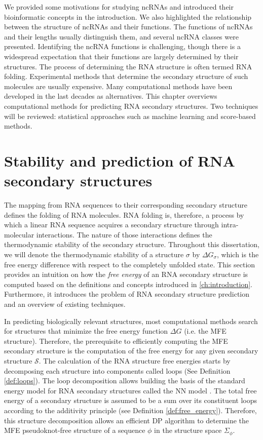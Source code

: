 We provided some motivations for studying \acp{ncRNA} and introduced their bioinformatic concepts in the introduction. We also highlighted the relationship between the structure of \acp{ncRNA} and their functions. The functions of \acp{ncRNA} and their lengths usually distinguish them, and several \ac{ncRNA} classes were presented. Identifying the \ac{ncRNA} functions is challenging, though there is a widespread expectation that their functions are largely determined by their structures. The process of determining the \ac{RNA} structure is often termed \ac{RNA} folding. Experimental methods that determine the secondary structure of such molecules are usually expensive. Many computational methods have been developed in the last decades as alternatives. This chapter overviews computational methods for predicting \ac{RNA} secondary structures. Two techniques will be reviewed: statistical approaches such as machine learning and score-based methods.


\section{Stability and prediction of RNA secondary structures}

The mapping from \ac{RNA} sequences to their corresponding secondary structure defines the folding of \ac{RNA} molecules. \ac{RNA} folding is, therefore, a process by which a linear \ac{RNA} sequence acquires a secondary structure through intra-molecular interactions. The nature of those interactions defines the thermodynamic stability of the secondary structure. Throughout this dissertation, we will denote the thermodynamic stability of a structure $\sigma$ by $\Delta G_{\sigma}$, which is the free energy difference with respect to the completely unfolded state.  This section provides an intuition on how the \textit{free energy} of an RNA secondary structure is computed based on the definitions and concepts introduced in \autoref{ch:introduction}. Furthermore, it introduces the problem of RNA secondary structure prediction and an overview of existing techniques. 


In predicting biologically relevant structures, most computational methods search for structures that minimize the free energy function $\Delta G$ (i.e. the \ac{MFE} structure). Therefore, the prerequisite to efficiently computing the \ac{MFE} secondary structure is the computation of the free energy for any given secondary structure $\mathcal {S}$. The calculation of the \ac{RNA} structure free energies starts by decomposing each structure into components called loops (See Definition \autoref{def:loops}). The loop decomposition allows building the basis of the standard energy model for \ac{RNA} secondary structures called the \ac{NN} model \cite{turner09_nndb}. The total free energy of a secondary structure is assumed to be a sum over its constituent loops according to the additivity principle \cite{dill97_addit_princ_bioch} (see Definition \ref{def:free_energy}). Therefore, this structure decomposition allows an efficient \ac{DP} algorithm to determine the \ac{MFE} pseudoknot-free structure of a sequence $\phi$ in the structure space $\Sigma_{\phi}$. 

